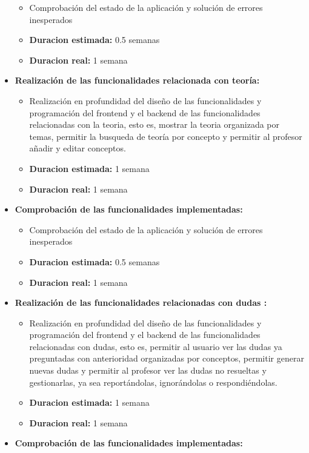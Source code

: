 \documentclass[openright,twoside,10pt]{book}
\providecommand{\tightlist}{%
  \setlength{\itemsep}{0pt}\setlength{\parskip}{0pt}}
\begin{document}
\begin{itemize}
      \begin{itemize}
      \tightlist
      \item
        Comprobación del estado de la aplicación y solución de errores
        inesperados
      \item
        \textbf{Duracion estimada:} 0.5 semanas
      \item
        \textbf{Duracion real:} 1 semana
      \end{itemize}
    \item
      \textbf{Realización de las funcionalidades relacionada con teoría:}
    
      \begin{itemize}
      \tightlist
      \item
        Realización en profundidad del diseño de las funcionalidades y
        programación del frontend y el backend de las funcionalidades
        relacionadas con la teoria, esto es, mostrar la teoria organizada
        por temas, permitir la busqueda de teoría por concepto y permitir al
        profesor añadir y editar conceptos.
      \item
        \textbf{Duracion estimada:} 1 semana
      \item
        \textbf{Duracion real:} 1 semana
      \end{itemize}
    \item
      \textbf{Comprobación de las funcionalidades implementadas:}
    
      \begin{itemize}
      \tightlist
      \item
        Comprobación del estado de la aplicación y solución de errores
        inesperados
      \item
        \textbf{Duracion estimada:} 0.5 semanas
      \item
        \textbf{Duracion real:} 1 semana
      \end{itemize}
    \item
      \textbf{Realización de las funcionalidades relacionadas con dudas :}
    
      \begin{itemize}
      \tightlist
      \item
        Realización en profundidad del diseño de las funcionalidades y
        programación del frontend y el backend de las funcionalidades
        relacionadas con dudas, esto es, permitir al usuario ver las dudas
        ya preguntadas con anterioridad organizadas por conceptos, permitir
        generar nuevas dudas y permitir al profesor ver las dudas no
        resueltas y gestionarlas, ya sea reportándolas, ignorándolas o
        respondiéndolas.
      \item
        \textbf{Duracion estimada:} 1 semana
      \item
        \textbf{Duracion real:} 1 semana
      \end{itemize}
    \item
      \textbf{Comprobación de las funcionalidades implementadas:}
    

\end{itemize}
\end{document}
